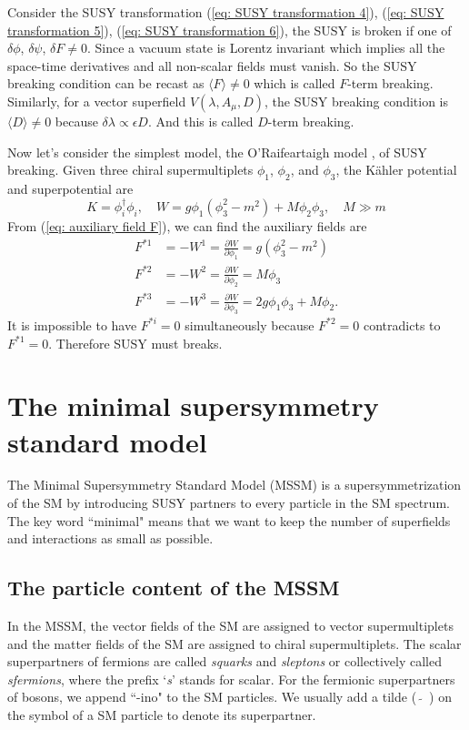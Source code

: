 \documentclass[12pt]{report}
\begin{document}
Consider the SUSY transformation (\ref{eq: SUSY transformation 4}), (\ref{eq: SUSY transformation 5}), (\ref{eq: SUSY transformation 6}), the SUSY is broken if one of $\delta \phi$, $\delta \psi$, $\delta F \neq 0$.
Since a vacuum state is Lorentz invariant which implies all the space-time derivatives and all non-scalar fields must vanish.
So the SUSY breaking condition can be recast as $\langle F \rangle \neq 0$ which is called $F$-term breaking.
Similarly, for a vector superfield $V(\lambda, A_{\mu}, D)$, the SUSY breaking condition is $\langle D \rangle \neq 0$ because $\delta \lambda \propto \epsilon D$.
And this is called $D$-term breaking.

Now let's consider the simplest model, the O'Raifeartaigh model \cite{O'Raifeartaigh},  of SUSY breaking. Given three chiral supermultiplets $\phi_{1}$, $\phi_{2}$, and $\phi_{3}$, the K\"{a}hler potential and superpotential are 
\begin{equation}
K = \phi^{\dag}_{i} \phi_{i}, \quad
W = g \phi_{1} ( \phi^{2}_{3} - m^{2}) + M \phi_{2} \phi_{3}, \quad
M \gg m
\end{equation}
From (\ref{eq: auxiliary field F}), we can find the auxiliary fields are
\begin{align}
F^{*1} &= - W^{1} = \frac{\partial W}{\partial \phi_{1}} = g ( \phi^{2}_{3} - m^{2})\\
F^{*2} &= - W^{2} = \frac{\partial W}{\partial \phi_{2}} = M \phi_{3}\\
F^{*3} &= - W^{3} = \frac{\partial W}{\partial \phi_{3}} = 2 g \phi_{1} \phi_{3} + M \phi_{2} .
\end{align}
It is impossible to have $F^{*i} = 0$ simultaneously because $F^{*2} = 0$ contradicts to $F^{*1} = 0$.
Therefore SUSY must breaks.





\chapter{The minimal supersymmetry standard model}
The Minimal Supersymmetry Standard Model (MSSM) is a supersymmetrization of the SM by introducing SUSY partners to every particle in the SM spectrum. 
The key word ``minimal" means that we want to keep the number of superfields and interactions as small as possible. 



\section{The particle content of the MSSM}
In the MSSM, the vector fields of the SM are assigned to vector supermultiplets and the matter fields of the SM are assigned to chiral supermultiplets.
The scalar superpartners of fermions are called \textit{squarks} and \textit{sleptons} or collectively called \textit{sfermions}, where the prefix `\textit{s}' stands for scalar.
For the fermionic superpartners of bosons, we append ``-ino" to the SM particles.
We usually add a tilde ($\widetilde{ \quad }$) on the symbol of a SM particle to denote its superpartner.
\end{document}
